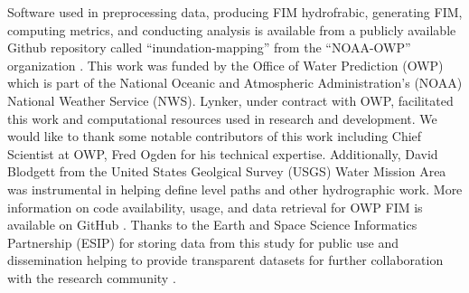 \documentclass[draft]{dependencies/agujournal2019}
\begin{document}
Software used in preprocessing data, producing FIM hydrofrabic, generating FIM, computing metrics, and conducting analysis is available from a publicly available Github repository called ``inundation-mapping'' from the ``NOAA-OWP'' organization \cite{inundationMapping2022}.
\clearpage %
\acknowledgments
%
This work was funded by the Office of Water Prediction (OWP) which is part of the National Oceanic and Atmospheric Administration's (NOAA) National Weather Service (NWS).
Lynker, under contract with OWP, facilitated this work and computational resources used in research and development.
We would like to thank some notable contributors of this work including Chief Scientist at OWP, Fred Ogden for his technical expertise.
Additionally, David Blodgett from the United States Geolgical Survey (USGS) Water Mission Area was instrumental in helping define level paths and other hydrographic work.
More information on code availability, usage, and data retrieval for OWP FIM is available on GitHub \cite{inundationMapping2022}.
Thanks to the Earth and Space Science Informatics Partnership (ESIP) for storing data from this study for public use and dissemination helping to provide transparent datasets for further collaboration with the research community \cite{esipData2022}.
\clearpage %

%



%
%
\end{document}
